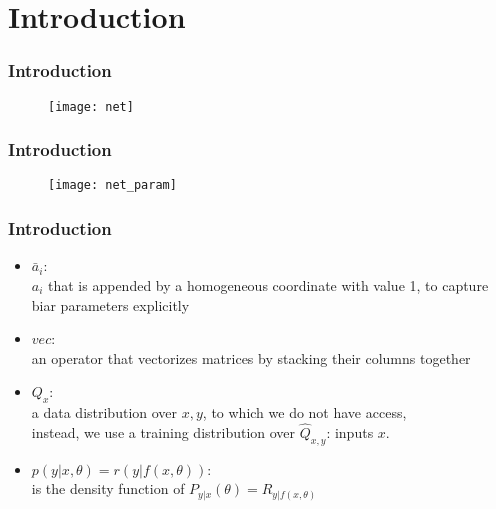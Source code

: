 \section{Introduction}

\begin{frame}
\frametitle{Introduction}

\begin{figure}
    \centering
    \texttt{[image: net]}
\end{figure}

\end{frame}

\begin{frame}
\frametitle{Introduction}

\begin{figure}
    \centering
    \texttt{[image: net\_param]}
\end{figure}

\end{frame}

\begin{frame}
\frametitle{Introduction}

\begin{itemize}
    \item $\bar{a}_i$:\\
        $a_i$ that is appended by a homogeneous coordinate with value 1,
        to capture biar parameters explicitly
    \item $vec$:\\
        an operator that vectorizes matrices by stacking their columns together
    \item $Q_x$:\\
        a data distribution over $x, y$, to which we do not have access,\\
        instead, we use a training distribution over $\hat{Q}_{x, y}$: inputs $x$.
    \item $p(y|x, \theta) = r(y|f(x, \theta))$:\\
        is the density function of $P_{y|x}(\theta) = R_{y|f(x,\theta)}$
\end{itemize}

\end{frame}

